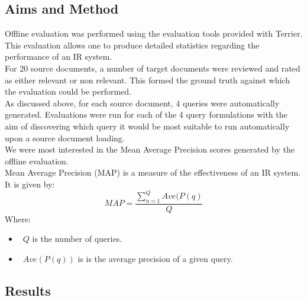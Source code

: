 \documentclass{l4proj}
\begin{document}
\subsection{Aims and Method}
Offline evaluation was performed using the evaluation tools provided with Terrier. This evaluation allows one to produce detailed statistics regarding the performance of an IR system.\\
For 20 source documents, a number of target documents were reviewed and rated as either relevant or non relevant. This formed the ground truth against which the evaluation could be performed.\\
As discussed above, for each source document, 4 queries were automatically generated. Evaluations were run for each of the 4 query formulations with the aim of discovering which query it would be most suitable to run automatically upon a source document loading.\\
We were most interested in the Mean Average Precision scores generated by the offline evaluation.\\
Mean Average Precision (MAP) is a measure of the effectiveness of an IR system.
It is given by:
\begin{displaymath}
  MAP=\frac{\sum_{n=1}^{Q} Ave(P(q)}{Q}
\end{displaymath}
Where: 
\begin{itemize}
\item{~$Q$ is the number of queries.}
\item{~$Ave(P(q))$ is is the average precision of a given query.}
\end{itemize}

\subsection{Results}
\end{document}
